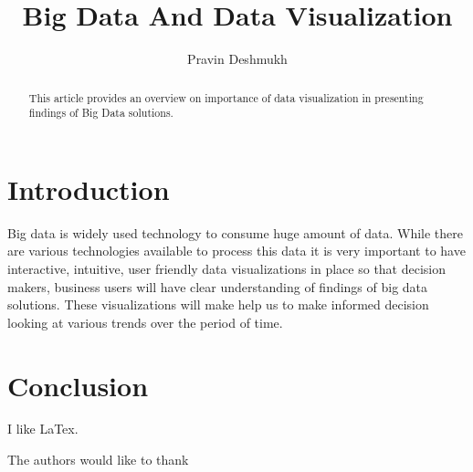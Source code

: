 \documentclass[sigconf]{acmart}
\begin{document}
\title{Big Data And Data Visualization}


\author{Pravin Deshmukh}




\begin{abstract}
This article provides an overview on importance of data visualization in presenting findings of Big Data solutions.
\end{abstract}



\maketitle

\section{Introduction}

Big data is widely used technology to consume huge amount of data. While there are various technologies available to process this data it is very important to have interactive, intuitive, user friendly data visualizations in place so that decision makers, business users will have clear understanding of findings of big data solutions. These visualizations will make help us to make informed decision looking at various trends over the period of time\cite{sept2917}.

\section{Conclusion}

I like LaTex. 

\begin{acks}

  The authors would like to thank 

\end{acks}


 
\end{document}
